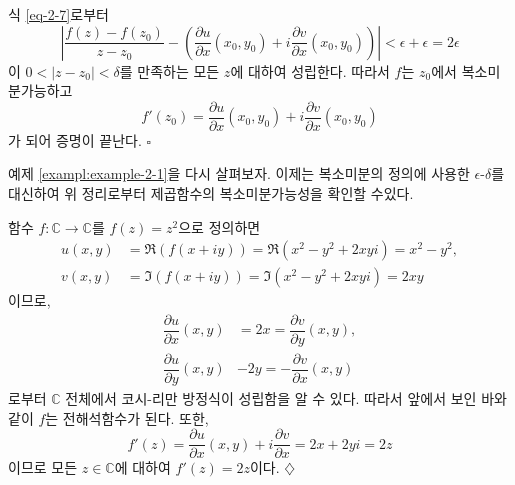 식 \eqref{eq-2-7}로부터
\[
\left| \dfrac{f(z)-f(z_0)}{z-z_0} 
- \left( \dfrac{\partial u}{\partial x}(x_0,y_0) 
+ i \dfrac{\partial v}{\partial x}(x_0,y_0) \right) \right|
< \epsilon + \epsilon = 2\epsilon
\]
이 $0<|z-z_0|<\delta$를 만족하는 모든 $z$에 대하여 성립한다.
따라서 $f$는 $z_0$에서 복소미분가능하고
\[
f'(z_0) = \dfrac{\partial u}{\partial x}(x_0,y_0) 
+ i \dfrac{\partial v}{\partial x}(x_0,y_0) 
\]
가 되어 증명이 끝난다.
\hfill $\square$

예제 \ref{exampl:example-2-1}을 다시 살펴보자.
이제는 복소미분의 정의에 사용한 $\epsilon$-$\delta$를 대신하여
위 정리로부터 제곱함수의 복소미분가능성을 확인할 수있다.

\begin{saltexample}[label=example-2-7]{}{}
함수  $f:\mathbb C \to \mathbb C$를 $f(z) = z^2$으로 정의하면
\begin{align*}
u(x,y) &= \Re(f(x+iy)) = \Re(x^2-y^2+2xyi) = x^2-y^2, \\
v(x,y) &= \Im(f(x+iy)) = \Im(x^2-y^2+2xyi) = 2xy
\end{align*}
이므로, 
\begin{align*}
\dfrac{\partial u}{\partial x}(x,y) &= 2x = \dfrac{\partial v}{\partial y}(x,y), \\
\dfrac{\partial u}{\partial y}(x,y) & -2y = - \dfrac{\partial v}{\partial x}(x,y)
\end{align*}
로부터 $\mathbb C$ 전체에서 코시-리만 방정식이 성립함을 알 수 있다.
따라서 앞에서 보인 바와 같이 $f$는 전해석함수가 된다.
또한, 
\[
f'(z) = \dfrac{\partial u}{\partial x}(x,y) + i\dfrac{\partial v}{\partial x}
= 2x + 2yi = 2z
\]
이므로 모든 $z\in\mathbb C$에 대하여 $f'(z) = 2z$이다.
\hfill $\diamondsuit$
\end{saltexample}

